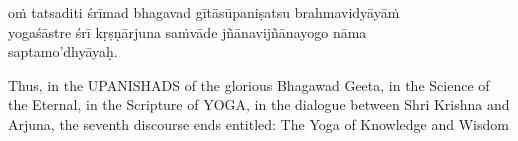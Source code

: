 \begin{transliteration}
oṁ tatsaditi śrīmad bhagavad gītāsūpaniṣatsu brahmavidyāyāṁ \\
yogaśāstre śrī kṛṣṇārjuna saṁvāde jñānavijñānayogo nāma \\
saptamo'dhyāyaḥ.
\end{transliteration}

Thus, in the UPANISHADS of the glorious Bhagawad Geeta, in the Science of the
Eternal, in the Scripture of YOGA, in the dialogue between Shri Krishna and
Arjuna, the seventh discourse ends entitled: The Yoga of Knowledge and Wisdom
